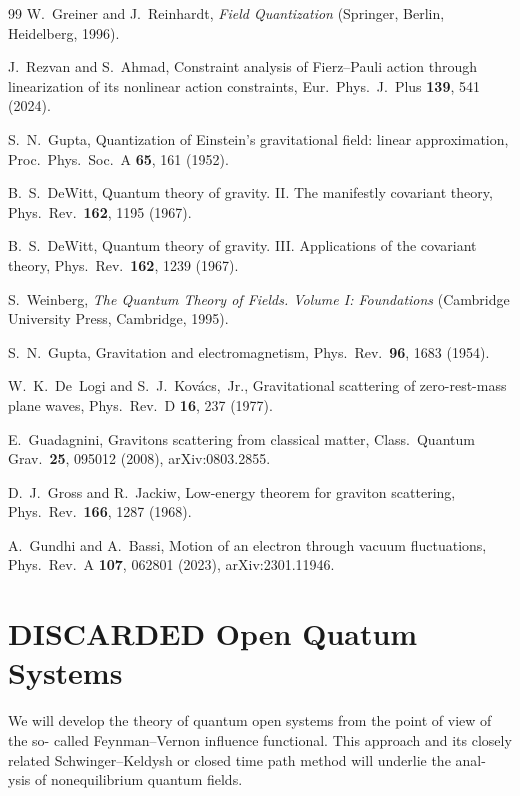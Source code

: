 \documentclass[12pt,a4paper,oneside]{article}
\numberwithin{equation}{section}   %
\begin{document}
\begin{thebibliography}{99}
W.~Greiner and J.~Reinhardt,
\textit{Field Quantization}
(Springer, Berlin, Heidelberg, 1996).

J.~Rezvan and S.~Ahmad,
Constraint analysis of Fierz--Pauli action through linearization of its
nonlinear action constraints,
Eur.\ Phys.\ J.\ Plus \textbf{139}, 541 (2024).

S.~N.~Gupta,
Quantization of Einstein's gravitational field: linear approximation,
Proc.\ Phys.\ Soc.\ A \textbf{65}, 161 (1952).

B.~S.~DeWitt,
Quantum theory of gravity. II. The manifestly covariant theory,
Phys.\ Rev.\ \textbf{162}, 1195 (1967).

B.~S.~DeWitt,
Quantum theory of gravity. III. Applications of the covariant theory,
Phys.\ Rev.\ \textbf{162}, 1239 (1967).

S.~Weinberg,
\textit{The Quantum Theory of Fields. Volume I: Foundations}
(Cambridge University Press, Cambridge, 1995).

S.~N.~Gupta,
Gravitation and electromagnetism,
Phys.\ Rev.\ \textbf{96}, 1683 (1954).

W.~K.~De~Logi and S.~J.~Kov\'acs,~Jr.,
Gravitational scattering of zero-rest-mass plane waves,
Phys.\ Rev.\ D \textbf{16}, 237 (1977).

E.~Guadagnini,
Gravitons scattering from classical matter,
Class.\ Quantum Grav.\ \textbf{25}, 095012 (2008),
arXiv:0803.2855.

D.~J.~Gross and R.~Jackiw,
Low-energy theorem for graviton scattering,
Phys.\ Rev.\ \textbf{166}, 1287 (1968).

A.~Gundhi and A.~Bassi,
Motion of an electron through vacuum fluctuations,
Phys.\ Rev.\ A \textbf{107}, 062801 (2023),
arXiv:2301.11946.

\end{thebibliography}

\section{DISCARDED Open Quatum Systems}
We will develop the theory of quantum open systems from the point of view of the so-
called Feynman–Vernon influence functional. This approach and its closely
related Schwinger–Keldysh or closed time path method will underlie the anal-
ysis of nonequilibrium quantum fields.
\end{document}
